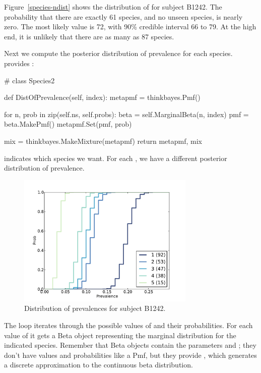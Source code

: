 \documentclass[12pt]{book}
\theoremstyle{exercise}
\begin{document}
Figure~\ref{species-ndist} shows the distribution of  for
subject B1242.  The probability that there are exactly 61 species, and
no unseen species, is nearly zero.  The most likely value is 72, with
90\% credible interval 66 to 79.  At the high end, it is unlikely that
there are as many as 87 species.

Next we compute the posterior distribution of prevalence for
each species.   provides :

\begin{code}
# class Species2

    def DistOfPrevalence(self, index):
        metapmf = thinkbayes.Pmf()

        for n, prob in zip(self.ns, self.probs):
            beta = self.MarginalBeta(n, index)
            pmf = beta.MakePmf()
            metapmf.Set(pmf, prob)

        mix = thinkbayes.MakeMixture(metapmf)
        return metapmf, mix
\end{code}

 indicates which species we want.  For each
, we have a different posterior distribution
of prevalence.

\begin{figure}
\centerline{\includegraphics[height=2.5in]{figs/species-prev-B1242.pdf}}
\caption{Distribution of prevalences for subject B1242.}
\label{species-prev}
\end{figure}

The loop iterates through the possible values of 
and their probabilities.  For each value of  it gets
a Beta object representing the marginal distribution for the
indicated species.  Remember that Beta objects contain the
parameters  and ; they don't have
values and probabilities like a Pmf, but they provide ,
which generates a discrete approximation to the continuous
beta distribution.
\end{document}
